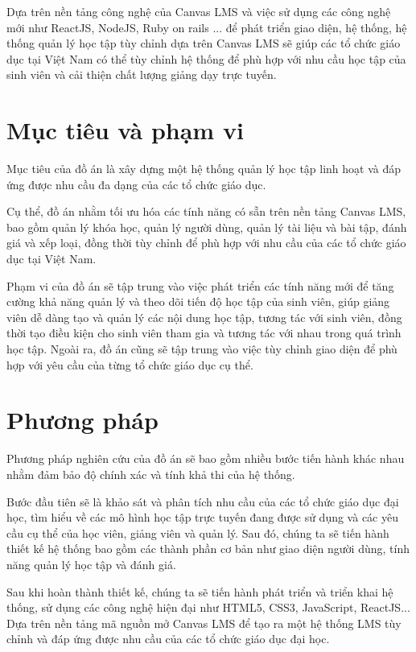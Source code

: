 \documentclass[../Thesis.tex]{subfiles}
\begin{document}
Dựa trên nền tảng công nghệ của Canvas LMS và việc sử dụng các công nghệ mới như ReactJS, NodeJS, Ruby on rails ... để phát triển giao diện, hệ thống, hệ thống quản lý học tập tùy chỉnh dựa trên Canvas LMS sẽ giúp các tổ chức giáo dục tại Việt Nam có thể tùy chỉnh hệ thống để phù hợp với nhu cầu học tập của sinh viên và cải thiện chất lượng giảng dạy trực tuyến.

\section{Mục tiêu và phạm vi}

Mục tiêu của đồ án là xây dựng một hệ thống quản lý học tập linh hoạt và đáp ứng được nhu cầu đa dạng của các tổ chức giáo dục.

Cụ thể, đồ án nhằm tối ưu hóa các tính năng có sẵn trên nền tảng Canvas LMS, bao gồm quản lý khóa học, quản lý người dùng, quản lý tài liệu và bài tập, đánh giá và xếp loại, đồng thời tùy chỉnh để phù hợp với nhu cầu của các tổ chức giáo dục tại Việt Nam.

Phạm vi của đồ án sẽ tập trung vào việc phát triển các tính năng mới để tăng cường khả năng quản lý và theo dõi tiến độ học tập của sinh viên, giúp giảng viên dễ dàng tạo và quản lý các nội dung học tập, tương tác với sinh viên, đồng thời tạo điều kiện cho sinh viên tham gia và tương tác với nhau trong quá trình học tập. Ngoài ra, đồ án cũng sẽ tập trung vào việc tùy chỉnh giao diện để phù hợp với yêu cầu của từng tổ chức giáo dục cụ thể.
\section{Phương pháp}
Phương pháp nghiên cứu của đồ án sẽ bao gồm nhiều bước tiến hành khác nhau nhằm đảm bảo độ chính xác và tính khả thi của hệ thống.

Bước đầu tiên sẽ là khảo sát và phân tích nhu cầu của các tổ chức giáo dục đại học, tìm hiểu về các mô hình học tập trực tuyến đang được sử dụng và các yêu cầu cụ thể của học viên, giảng viên và quản lý. Sau đó, chúng ta sẽ tiến hành thiết kế hệ thống bao gồm các thành phần cơ bản như giao diện người dùng, tính năng quản lý học tập và đánh giá.

Sau khi hoàn thành thiết kế, chúng ta sẽ tiến hành phát triển và triển khai hệ thống, sử dụng các công nghệ hiện đại như HTML5, CSS3, JavaScript, ReactJS... Dựa trên nền tảng mã nguồn mở Canvas LMS để tạo ra một hệ thống LMS tùy chỉnh và đáp ứng được nhu cầu của các tổ chức giáo dục đại học.
\end{document}
